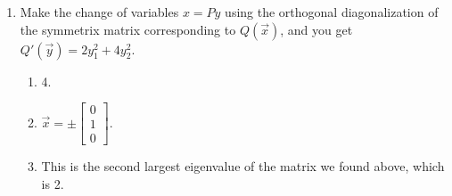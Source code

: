 \begin{enumerate}
	\item Make the change of variables \(x = Py\) using the orthogonal diagonalization of the symmetrix matrix corresponding to \(Q(\vec{x})\), and you get
		\(Q'(\vec{y}) = 2y_1^2 + 4y_2^2\).
		\begin{enumerate}
			\item 4.
			\item \(\vec{x} = \pm\begin{bmatrix}0 \\ 1 \\ 0\end{bmatrix}\).
			\item This is the second largest eigenvalue of the matrix we found above, which is 2.
		\end{enumerate}
	 

\end{enumerate}
